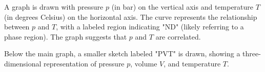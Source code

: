A graph is drawn with pressure \( p \) (in bar) on the vertical axis and temperature \( T \) (in degrees Celsius) on the horizontal axis. The curve represents the relationship between \( p \) and \( T \), with a labeled region indicating "ND" (likely referring to a phase region). The graph suggests that \( p \) and \( T \) are correlated.  

Below the main graph, a smaller sketch labeled "PVT" is drawn, showing a three-dimensional representation of pressure \( p \), volume \( V \), and temperature \( T \).